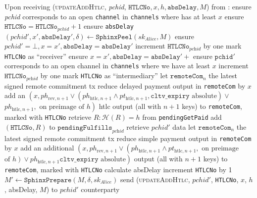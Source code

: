 \begin{algorithmic}[1]
    \State Upon receiving (\textsc{updateAddHtlc}, \textit{pchid},
    $\mathtt{HTLCNo}, x, h, \mathtt{absDelay}, M$) from \bob:
    \Indent
      \State ensure \textit{pchid} corresponds to an open \texttt{channel} in
      \texttt{channels} where \bob{} has at least $x$
      \State ensure $\mathtt{HTLCNo} = \mathtt{HTLCNo}_{\mathit{pchid}} + 1$
      \State ensure \texttt{absDelay} 
      \State $\left(\mathit{pchid}', x', \mathtt{absDelay}', \delta\right) \gets
      \mathtt{SphinxPeel}\left(sk_{\textit{Alice}}, M\right)$
        \State ensure $\mathit{pchid}' = \bot, x = x', \mathtt{absDelay} =
        \mathtt{absDelay}'$
        \State increment $\mathtt{HTLCNo}_{\textit{pchid}}$ by one
        \State mark \texttt{HTLCNo} as ``receiver''
      \Else {}
        \State ensure $x = x', \mathtt{absDelay} = \mathtt{absDelay}' +$
        \State ensure $\mathtt{pchid}'$ corresponds to an open channel in
        \texttt{channels} where we have at least $x$
        \State increment $\mathtt{HTLCNo}_{\textit{pchid}}$ by one
        \State mark \texttt{HTLCNo} as ``intermediary''
      \EndIf
      \State let $\mathtt{remoteCom}_n$ the latest signed remote commitment tx
      \State reduce delayed payment output in \texttt{remoteCom} by $x$
      \State add an $\left(x, ph_{\mathrm{rev}, n+1} \vee
      \left(ph_{\mathrm{htlc}, n+1} \wedge pt_{\mathrm{htlc}, n+1},
      \mathtt{cltv\_expiry} \text{ absolute}\right) \vee\right.$
      $\left.ph_{\mathrm{htlc}, n+1}, \text{ on preimage of } h\right)$ htlc
      output (all with $n+1$ keys) to \texttt{remoteCom}, marked with
      \texttt{HTLCNo}
        \State retrieve $R : \mathcal{H}\left(R\right) = h$ from
        \texttt{pendingGetPaid}
        \State add $\left(\mathtt{HTLCNo}, R\right)$ to
        $\mathtt{pendingFulfills}_{\textit{pchid}}$
       
        \State retrieve $\mathit{pchid}'$ data
        \State let $\mathtt{remoteCom}_n$ the latest signed remote commitment tx
        \State reduce simple payment output in \texttt{remoteCom} by $x$
        \State add an additional $\left(x, ph_{\mathrm{rev}, n+1} \vee
        \left(ph_{\mathrm{htlc}, n+1} \wedge pt_{\mathrm{htlc}, n+1}, \text{ on
        preimage}\right.\right.$ $\left.\left.\text{of } h\right) \vee
        ph_{\mathrm{htlc}, n+1}\mathtt{cltv\_expiry} \text{ absolute}\right)$
        output (all with $n+1$ keys) to \texttt{remoteCom}, marked with
        \texttt{HTLCNo}
        \State calculate absDelay \TODO{}
        \State increment \texttt{HTLCNo} by 1
        \State $M' \gets \mathtt{SphinxPrepare}\left(M, \delta,
        sk_{\mathit{Alice}}\right)$
        \State send (\textsc{updateAddHtlc}, $\mathit{pchid}'$, \texttt{HTLCNo},
        $x$, $h$, absDelay, $M$) to $\mathit{pchid}'$ counterparty
      \EndIf
    \EndIndent
    \State


\end{algorithmic}
